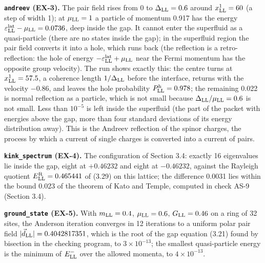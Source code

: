 \documentclass[
  10pt,
]{article}
\begin{document}
\textbf{\texttt{andreev} (EX-3).} The pair field rises from 0 to
\(\Delta_{\rm LL}=0.6\) around \(x^1_{\rm LL}=60\) (a step of width 1);
at \(\mu_{\rm LL}=1\) a particle of momentum 0.917 has the energy
\(\varepsilon^{\rm lat}_{\rm LL}-\mu_{\rm LL}=0.0736\), deep inside the
gap. It cannot enter the superfluid as a quasi-particle (there are no
states inside the gap); in the superfluid region the pair field converts
it into a hole, which runs back (the reflection is a retro-reflection:
the hole of energy \(-\varepsilon^{\rm lat}_{\rm LL}+\mu_{\rm LL}\) near
the Fermi momentum has the opposite group velocity). The run shows
exactly this: the centre turns at \(x^1_{\rm LL}=57.5\), a coherence
length \(1/\Delta_{\rm LL}\) before the interface, returns with the
velocity \(-0.86\), and leaves the hole probability
\(P^{\rm h}_{\rm LL}=0.978\); the remaining 0.022 is normal reflection
as a particle, which is not small because
\(\Delta_{\rm LL}/\mu_{\rm LL}=0.6\) is not small. Less than \(10^{-5}\)
is left inside the superfluid (the part of the packet with energies
above the gap, more than four standard deviations of its energy
distribution away). This is the Andreev reflection of the spinor
charges, the process by which a current of single charges is converted
into a current of pairs.

\textbf{\texttt{kink\_spectrum} (EX-4).} The configuration of Section
3.4: exactly 16 eigenvalues lie inside the gap, eight at \(+0.46232\)
and eight at \(-0.46232\), against the Rayleigh quotient
\(E^{\rm R}_{\rm LL}=0.465441\) of (3.29) on this lattice; the
difference 0.0031 lies within the bound 0.023 of the theorem of Kato and
Temple, computed in check AS-9 (Section 3.4).

\textbf{\texttt{ground\_state} (EX-5).} With \(m_{\rm LL}=0.4\),
\(\mu_{\rm LL}=0.6\), \(G_{\rm LL}=0.46\) on a ring of 32 sites, the
Anderson iteration converges in 12 iterations to a uniform polar pair
field \(\lvert\vec d_{\rm LL}\rvert=0.4042817351\), which is the root of
the gap equation (3.21) found by bisection in the checking program, to
\(3\times10^{-13}\); the smallest quasi-particle energy is the minimum
of \(E^-_{\rm LL}\) over the allowed momenta, to \(4\times10^{-13}\).
\end{document}
